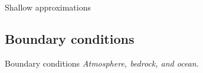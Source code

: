 
    \begin{frame}{Shallow approximations}
      \centering
      
    \end{frame}


\subsection{Boundary conditions}

    \begin{sectionframe}{Boundary conditions}
      \emph{Atmosphere, bedrock, and ocean.}
    \end{sectionframe}

